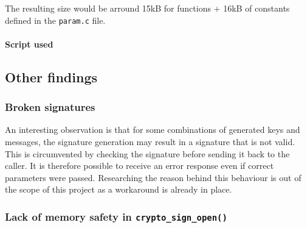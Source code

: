 \documentclass[
]{article}
\newenvironment{Shaded}{}{}
\newcommand{\BuiltInTok}[1]{#1}
\newcommand{\ExtensionTok}[1]{#1}
\newcommand{\FunctionTok}[1]{\textcolor[rgb]{0.02,0.16,0.49}{#1}}
\newcommand{\KeywordTok}[1]{\textcolor[rgb]{0.00,0.44,0.13}{\textbf{#1}}}
\newcommand{\NormalTok}[1]{#1}
\newcommand{\StringTok}[1]{\textcolor[rgb]{0.25,0.44,0.63}{#1}}
\newcommand{\VariableTok}[1]{\textcolor[rgb]{0.10,0.09,0.49}{#1}}
\begin{document}
The resulting size would be arround 15kB for functions + 16kB of
constants defined in the \texttt{param.c} file.

\hypertarget{script-used}{%
\paragraph{Script used}\label{script-used}}

\begin{Shaded}
\end{Shaded}

\hypertarget{other-findings}{%
\subsection{Other findings}\label{other-findings}}

\hypertarget{broken-signatures}{%
\subsubsection{Broken signatures}\label{broken-signatures}}

An interesting observation is that for some combinations of generated
keys and messages, the signature generation may result in a signature
that is not valid. This is circumvented by checking the signature before
sending it back to the caller. It is therefore possible to receive an
error response even if correct parameters were passed. Researching the
reason behind this behaviour is out of the scope of this project as a
workaround is already in place.

\hypertarget{lack-of-memory-safety-in-crypto_sign_open}{%
\subsubsection{\texorpdfstring{Lack of memory safety in
\texttt{crypto\_sign\_open()}}{Lack of memory safety in crypto\_sign\_open()}}\label{lack-of-memory-safety-in-crypto_sign_open}}
\end{document}
